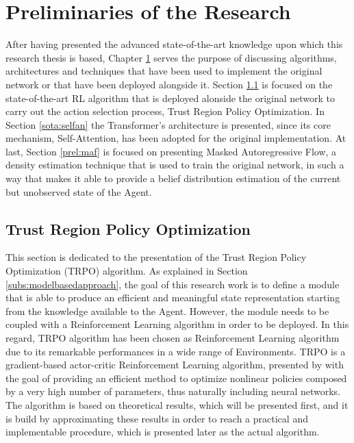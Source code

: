 \chapter{Preliminaries of the Research}
    \label{chap:prel}
    After having presented the advanced state-of-the-art knowledge upon which this research thesis is based, Chapter \ref{chap:prel} serves the purpose of discussing algorithms, architectures and techniques that have been used to implement the original network or that have been deployed alongside it. Section \ref{sota:trpo} is focused on the state-of-the-art RL algorithm that is deployed alonside the original network to carry out the action selection process, Trust Region Policy Optimization. In Section \ref{sota:selfan} the Transformer's architecture is presented, since its core mechanism, Self-Attention, has been adopted for the original implementation. At last, Section \ref{prel:maf} is focused on presenting Masked Autoregressive Flow, a density estimation technique that is used to train the original network, in such a way that makes it able to provide a belief distribution estimation of the current but unobserved state of the Agent.
    
    \section{Trust Region Policy Optimization}
        \label{sota:trpo}
        This section is dedicated to the presentation of the Trust Region Policy Optimization (TRPO) algorithm. As explained in Section \ref{subs:modelbasedapproach}, the goal of this research work is to define a module that is able to produce an efficient and meaningful state representation starting from the knowledge available to the Agent. However, the module needs to be coupled with a Reinforcement Learning algorithm in order to be deployed. In this regard, TRPO algorithm has been chosen as Reinforcement Learning algorithm due to its remarkable performances in a wide range of Environments. \newline
        TRPO is a gradient-based actor-critic Reinforcement Learning algorithm, presented by  with the goal of providing an efficient method to optimize nonlinear policies composed by a very high number of parameters, thus naturally including neural networks. The algorithm is based on theoretical results, which will be presented first, and it is build by approximating these results in order to reach a practical and implementable procedure, which is presented later as the actual algorithm.
        
